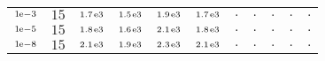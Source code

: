 \begin{tiny}
\begin{tabular}{@{$\;$}c@{$\;$}|@{$\;$}c@{$\;$}@{$\;$}c@{$\;$}@{$\;$}c@{$\;$}@{$\;$}c@{$\;$}@{$\;$}c@{$\;$}|@{$\;$}c@{$\;$}@{$\;$}c@{$\;$}@{$\;$}c@{$\;$}@{$\;$}c@{$\;$}@{$\;$}c@{$\;$}}
$\scriptstyle1\!\mathrm{\hspace{0.10em}e}-3$ & $\scriptstyle15$ & $\scriptstyle1.7\mathrm{\hspace{0.10em}e}3$ & $\scriptstyle1.5\mathrm{\hspace{0.10em}e}3$ & $\scriptstyle1.9\mathrm{\hspace{0.10em}e}3$ & $\scriptstyle1.7\mathrm{\hspace{0.10em}e}3$ & $\scriptstyle.$ & $\scriptstyle.$ & $\scriptstyle.$ & $\scriptstyle.$ & $\scriptstyle.$\\ 
$\scriptstyle1\!\mathrm{\hspace{0.10em}e}-5$ & $\scriptstyle15$ & $\scriptstyle1.8\mathrm{\hspace{0.10em}e}3$ & $\scriptstyle1.6\mathrm{\hspace{0.10em}e}3$ & $\scriptstyle2.1\mathrm{\hspace{0.10em}e}3$ & $\scriptstyle1.8\mathrm{\hspace{0.10em}e}3$ & $\scriptstyle.$ & $\scriptstyle.$ & $\scriptstyle.$ & $\scriptstyle.$ & $\scriptstyle.$\\ 
$\scriptstyle1\!\mathrm{\hspace{0.10em}e}-8$ & $\scriptstyle15$ & $\scriptstyle2.1\mathrm{\hspace{0.10em}e}3$ & $\scriptstyle1.9\mathrm{\hspace{0.10em}e}3$ & $\scriptstyle2.3\mathrm{\hspace{0.10em}e}3$ & $\scriptstyle2.1\mathrm{\hspace{0.10em}e}3$ & $\scriptstyle.$ & $\scriptstyle.$ & $\scriptstyle.$ & $\scriptstyle.$ & $\scriptstyle.$\\ 
\end{tabular} 
\end{tiny} 
